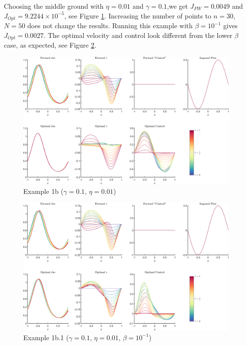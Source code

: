 \documentclass[11pt, a4paper]{article}
\theoremstyle{definition}
\begin{document}
    Choosing the middle ground with $\eta = 0.01$ and $\gamma =0.1$,we get $J_{FW} = 0.0049$ and $J_{Opt} = 9.2244 \times 10^{-5}$, see Figure \ref{fig1b}. Increasing the number of points to $n = 30$, $N = 50$ does not change the results. Running this example with $\beta = 10^{-1}$ gives $J_{Opt} = 0.0027$. The optimal velocity and control look different from the lower $\beta$ case, as expected, see Figure \ref{fig1b1}.
	\begin{figure}
		\includegraphics[scale=0.05]{Example1b.png}
		\caption{Example 1b ($\gamma = 0.1$, $\eta = 0.01$)}
		\label{fig1b}
	\end{figure}   
\begin{figure}
	\includegraphics[scale=0.05]{Example1b1.png}
	\caption{Example 1b.1 ($\gamma = 0.1$, $\eta = 0.01$, $\beta = 10^{-1}$)}
	\label{fig1b1}
\end{figure}
	   
\end{document}
